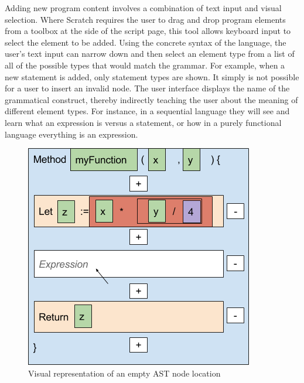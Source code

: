 Adding new program content involves a combination of text input and visual selection. Where Scratch requires the user to drag and drop program elements from a toolbox at the side of the script page, this tool allows keyboard input to select the element to be added. Using the concrete syntax of the language, the user's text input can narrow down and then select an element type from a list of all of the possible types that would match the grammar. For example, when a new statement is added, only statement types are shown. It simply is not possible for a user to insert an invalid node. The user interface displays the name of the grammatical construct, thereby indirectly teaching the user about the meaning of different element types. For instance, in a sequential language they will see and learn what an expression is versus a statement, or how in a purely functional language everything is an expression.

\begin{figure}[H]
\centering
\includegraphics[scale=0.5]{graphics/astentry1} %
\caption{Visual representation of an empty AST node location}
\label{fig:astentry1} %
\end{figure}

